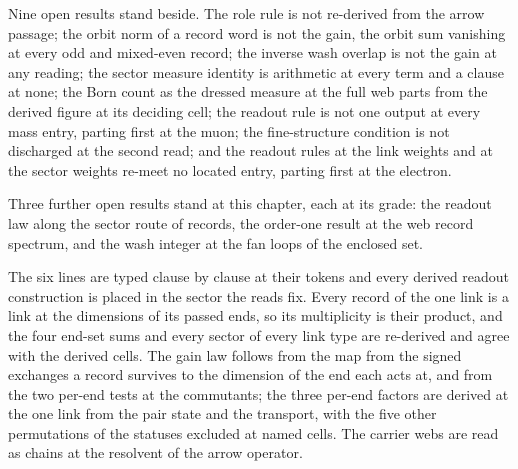 \begin{chwall}\label{box:I-3-records-reads-and-the-born-count-the-gain-lemma:5}
Nine open results stand beside. The role rule is not re-derived from the arrow passage; the orbit norm of a record word is not the gain, the orbit sum vanishing at every odd and mixed-even record; the inverse wash overlap is not the gain at any reading; the sector measure identity is arithmetic at every term and a clause at none; the Born count as the dressed measure at the full web parts from the derived figure at its deciding cell; the readout rule is not one output at every mass entry, parting first at the muon; the fine-structure condition is not discharged at the second read; and the readout rules at the link weights and at the sector weights re-meet no located entry, parting first at the electron.
\end{chwall}
\begin{chwall}\label{box:I-3-records-reads-and-the-born-count-the-gain-lemma:6}
Three further open results stand at this chapter, each at its grade: the readout law along the sector route of records, the order-one result at the web record spectrum, and the wash integer at the fan loops of the enclosed set.
\end{chwall}
The six lines are typed clause by clause at their tokens and every derived readout construction is placed in the sector the reads fix. Every record of the one link is a link at the dimensions of its passed ends, so its multiplicity is their product, and the four end-set sums and every sector of every link type are re-derived and agree with the derived cells. The gain law follows from the map from the signed exchanges a record survives to the dimension of the end each acts at, and from the two per-end tests at the commutants; the three per-end factors are derived at the one link from the pair state and the transport, with the five other permutations of the statuses excluded at named cells. The carrier webs are read as chains at the resolvent of the arrow operator.


